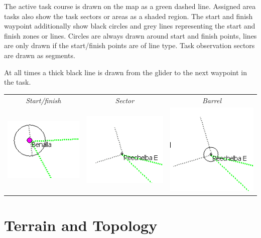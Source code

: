 \documentclass[a4paper,12pt]{refrep}
\begin{document}
The active task course is drawn on the map as a green dashed line.
Assigned area tasks also show the task sectors or areas as a shaded
region.  The start and finish waypoint additionally show black circles
and grey lines representing the start and finish zones or lines.
Circles are always drawn around start and finish points, lines are
only drawn if the start/finish points are of line type.  Task
observation sectors are drawn as segments.

At all times a thick black line is drawn from the glider to the next
waypoint in the task.

\begin{center}

\begin{tabular}{c c c}
{\it Start/finish} & {\it Sector} & {\it Barrel} \\
\includegraphics[angle=0,width=0.3\linewidth,keepaspectratio='true']{figures/cut-startfinish.png} &
\includegraphics[angle=0,width=0.3\linewidth,keepaspectratio='true']{figures/cut-sector.png} &
\includegraphics[angle=0,width=0.3\linewidth,keepaspectratio='true']{figures/cut-barrel.png} \\
\end{tabular}
\end{center}

\section{Terrain and Topology}
\end{document}
